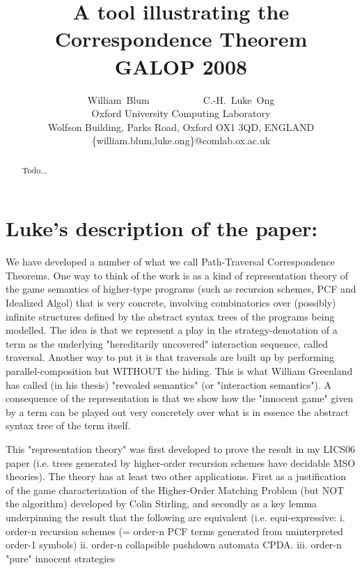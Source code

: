 
\usepackage{graphicx}
\usepackage{url}
\def\toolname{HOG}


\title{A tool illustrating the Correspondence Theorem
\\ GALOP 2008}

\author{William~Blum~~~~~~~~~~~C.-H.~Luke~Ong\\
Oxford University Computing Laboratory\\
Wolfson Building, Parks Road, Oxford OX1 3QD, ENGLAND\\
\{william.blum,luke.ong\}@comlab.ox.ac.uk }




\maketitle \thispagestyle{empty}

\begin{abstract}
Todo...
\end{abstract}

\tableofcontents

\section{Luke's description of the paper:}

 We have developed a number of what we call Path-Traversal
Correspondence Theorems. One way to think of the work is as a kind of representation theory of the game semantics of higher-type programs (such as recursion schemes, PCF and Idealized Algol) that is very concrete, involving combinatorics over (possibly) infinite structures defined by the abstract syntax trees of the programs being modelled. The idea is that we represent a play in the strategy-denotation of a term as the underlying "hereditarily uncovered" interaction sequence, called traversal. Another way to put it is that traversals are built up by performing parallel-composition but WITHOUT the hiding. This is what William Greenland has called (in his thesis) "revealed semantics" (or "interaction semantics"). A consequence of the representation is that we show how the "innocent game" given by a term can be played out very concretely over what is in essence the abstract syntax tree of the term itself.

This "representation theory" was first developed to prove the result in my LICS06 paper (i.e. trees generated by higher-order recursion schemes have decidable MSO theories). The theory has at least two other applications. First as a justification of the game characterization of the Higher-Order Matching Problem (but NOT the algorithm) developed by Colin Stirling, and secondly as a key lemma underpinning the result that
 the following are equivalent (i.e. equi-expressive:
i. order-n recursion schemes (= order-n PCF terms generated from uninterpreted order-1 symbols) ii. order-n collapsible pushdown automata CPDA. iii. order-n "pure" innocent strategies

